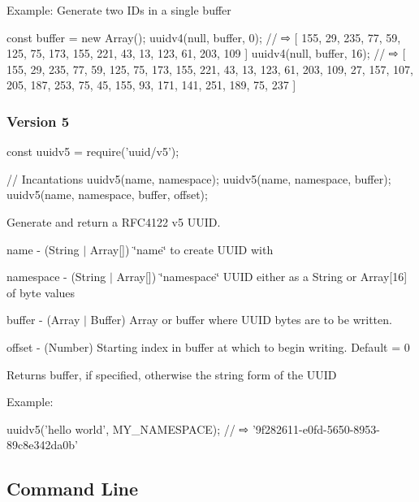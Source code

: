 Example\+: Generate two I\+Ds in a single buffer


\begin{DoxyCode}
const buffer = new Array();
uuidv4(null, buffer, 0);  // ⇨ [ 155, 29, 235, 77, 59, 125, 75, 173, 155, 221, 43, 13, 123, 61, 203, 109 ]
uuidv4(null, buffer, 16); // ⇨ [ 155, 29, 235, 77, 59, 125, 75, 173, 155, 221, 43, 13, 123, 61, 203, 109,
       27, 157, 107, 205, 187, 253, 75, 45, 155, 93, 171, 141, 251, 189, 75, 237 ]
\end{DoxyCode}


\subsubsection*{Version 5}


\begin{DoxyCode}
const uuidv5 = require('uuid/v5');

// Incantations
uuidv5(name, namespace);
uuidv5(name, namespace, buffer);
uuidv5(name, namespace, buffer, offset);
\end{DoxyCode}


Generate and return a R\+F\+C4122 v5 U\+U\+ID.


\begin{DoxyItemize}
\item {\ttfamily name} -\/ (String $\vert$ Array\mbox{[}\mbox{]}) \char`\"{}name\char`\"{} to create U\+U\+ID with
\item {\ttfamily namespace} -\/ (String $\vert$ Array\mbox{[}\mbox{]}) \char`\"{}namespace\char`\"{} U\+U\+ID either as a String or Array\mbox{[}16\mbox{]} of byte values
\item {\ttfamily buffer} -\/ (Array $\vert$ Buffer) Array or buffer where U\+U\+ID bytes are to be written.
\item {\ttfamily offset} -\/ (Number) Starting index in {\ttfamily buffer} at which to begin writing. Default = 0
\end{DoxyItemize}

Returns {\ttfamily buffer}, if specified, otherwise the string form of the U\+U\+ID

Example\+:


\begin{DoxyCode}
uuidv5('hello world', MY\_NAMESPACE);  // ⇨ '9f282611-e0fd-5650-8953-89c8e342da0b'
\end{DoxyCode}


\subsection*{Command Line}

